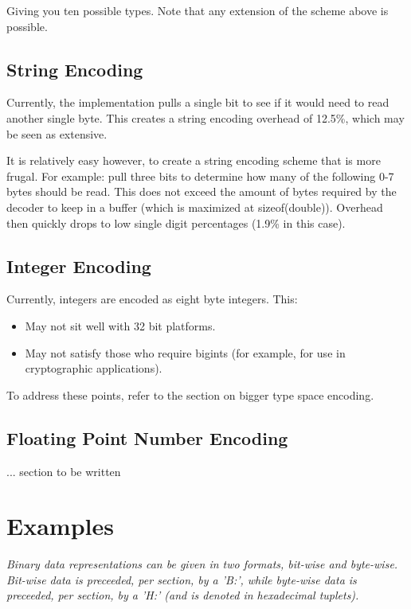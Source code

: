 Giving you ten possible types. Note that any extension of the scheme
above is possible.

\subsection{String Encoding}

Currently, the implementation pulls a single bit to see if it would need
to read another single byte. This creates a string encoding overhead of
12.5\%, which may be seen as extensive.

It is relatively easy however, to create a string encoding scheme that
is more frugal. For example: pull three bits to determine how many of the
following 0-7 bytes should be read. This does not exceed the amount of
bytes required by the decoder to keep in a buffer (which is maximized at
sizeof(double)). Overhead then quickly drops to low
single digit percentages (1.9\% in this case).

\subsection{Integer Encoding}

Currently, integers are encoded as eight byte integers. This:

\begin{itemize}
\item May not sit well with 32 bit platforms.
\item May not satisfy those who require bigints (for example, for use in
      cryptographic applications).
\end{itemize}

To address these points, refer to the section on bigger type space
encoding.

\subsection{Floating Point Number Encoding}

... section to be written

\section{Examples}

\textit{
Binary data representations can be given in two formats, bit-wise and byte-wise.
Bit-wise data is preceeded, per section, by a 'B:',
while byte-wise data is preceeded, per section, by a 'H:' (and is denoted in
hexadecimal tuplets).
}

